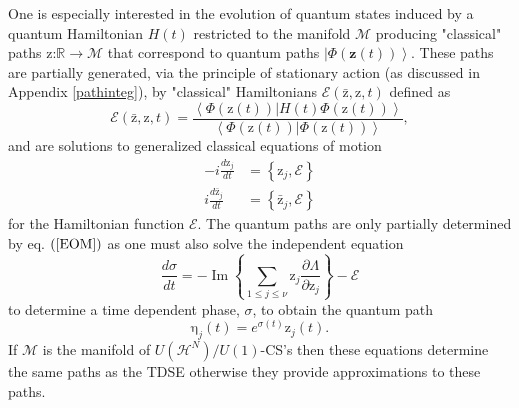 \documentclass[aps,preprint]{revtex4}%
\begin{document}
One is especially interested in the evolution of quantum states induced by a
quantum Hamiltonian $H\left(  t\right)  $ restricted to the manifold
$\mathcal{M}$ producing "classical" paths \textrm{z:}$\mathbb{R\rightarrow
}\mathcal{M}$\textrm{ }that\textrm{ }correspond to quantum paths $\left\vert
\Phi\left(  \mathbf{z}\left(  t\right)  \right)  \right\rangle $. These paths
are partially generated, via the principle of stationary action (as discussed
in Appendix \ref{pathinteg}), by "classical" Hamiltonians $\mathcal{E}\left(
\mathrm{\bar{z}}\mathbf{,}\mathrm{z},t\right)  $ defined as
\begin{equation}
\mathcal{E}\left(  \mathrm{\bar{z}}\mathbf{,}\mathrm{z},t\right)
=\frac{\left\langle \left.  \Phi\left(  \mathrm{z}\left(  t\right)  \right)
\right\vert H\left(  t\right)  \Phi\left(  \mathrm{z}\left(  t\right)
\right)  \right\rangle }{\left\langle \left.  \Phi\left(  \mathrm{z}\left(
t\right)  \right)  \right\vert \Phi\left(  \mathrm{z}\left(  t\right)
\right)  \right\rangle },
\end{equation}
and are solutions to generalized classical equations of motion
\begin{align}
-i\frac{d\mathrm{z}_{j}}{dt}  &  =\left\{  \mathrm{z}_{j},\mathcal{E}\right\}
\nonumber\\
i\frac{d\mathrm{\bar{z}}_{j}}{dt}  &  =\left\{  \mathrm{\bar{z}}%
_{j},\mathcal{E}\right\}  \label{EOM}%
\end{align}
for the Hamiltonian function $\mathcal{E}$. The quantum paths are only
partially determined by eq. $\left(  \ref{EOM}\right)  $ as one must also
solve the independent equation
\begin{equation}
\frac{d\sigma}{dt}=-\operatorname{Im}\left\{  \sum_{1\leq j\leq\nu}%
\mathrm{z}_{j}\frac{\partial\Lambda}{\partial\mathrm{z}_{j}}\right\}
-\mathcal{E} \label{phase}%
\end{equation}
to determine a time dependent phase, $\sigma$, to obtain the quantum path
\cite{K&S}
\begin{equation}
\mathrm{\eta}_{j}\left(  t\right)  =e^{\sigma\left(  t\right)  }\mathrm{z}%
_{j}\left(  t\right)  .
\end{equation}
If $\mathcal{M}$ is the manifold of $U\left(  \mathcal{H}^{N}\right)
/U\left(  1\right)  $-CS's then these equations determine the same paths as
the TDSE otherwise they provide approximations to these paths.
\end{document}
